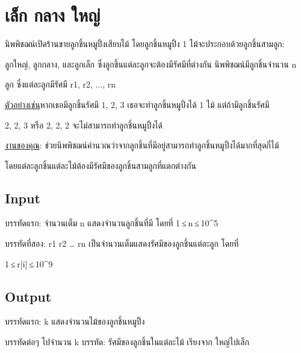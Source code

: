 \documentclass{article}
\begin{document}
\section*{เล็ก กลาง ใหญ่}

นิพพิชฌน์เปิดร้านขายลูกชิ้นหมูปิ้งเสียบไม้ โดยลูกชิ้นหมูปิ้ง 1 ไม้จะประกอบด้วยลูกชิ้นสามลูก:

ลูกใหญ่, ลูกกลาง, และลูกเล็ก ซึ่งลูกชิ้นแต่ละลูกจะต้องมีรัศมีที่ต่างกัน นิพพิชฌน์มีลูกชิ้นจำนวน n

ลูก ซึ่งแต่ละลูกมีรัศมี r1, r2, ..., rn



\ul{ตัวอย่างเช่น}หากเธอมีลูกชิ้นรัศมี 1, 2, 3 เธอจะทำลูกชิ้นหมูปิ้งได้ 1 ไม้ แต่ถ้ามีลูกชิ้นรัศมี

2, 2, 3 หรือ 2, 2, 2 จะไม่สามารถทำลูกชิ้นหมูปิ้งได้



\ul{งานของคุณ}: ช่วยนิพพิชฌน์คำนวณว่าจากลูกชิ้นที่มีอยู่สามารถทำลูกชิ้นหมูปิ้งได้มากที่สุดกี่ไม้

โดยแต่ละลูกชิ้นแต่ละไม้ต้องมีรัศมีของลูกชิ้นสามลูกที่แตกต่างกัน



\subsection*{Input}
บรรทัดแรก: จำนวนเต็ม n แสดงจำนวนลูกชิ้นที่มี โดยที่ 1 ≤ n ≤ 10\^{}5



บรรทัดที่สอง: r1 r2 \ldots{} rn เป็นจำนวนเต็มแสดงรัศมีของลูกชิ้นแต่ละลูก โดยที่

1 ≤ r{[}i{]} ≤ 10\^{}9



\subsection*{Output}
บรรทัดแรก: k แสดงจำนวนไม้ของลูกชิ้นหมูปิ้ง



บรรทัดต่อๆ ไปจำนวน k บรรทัด: รัศมีของลูกชิ้นในแต่ละไม้ เรียงจาก ใหญ่ไปเล็ก
\end{document}
